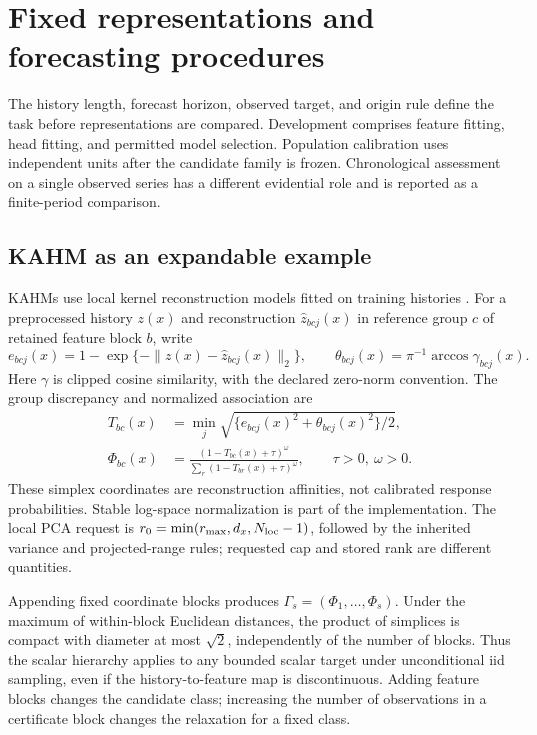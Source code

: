 \section{Fixed representations and forecasting procedures}
\label{sec:representations}
The history length, forecast horizon, observed target, and origin rule define the task before representations are compared. Development comprises feature fitting, head fitting, and permitted model selection. Population calibration uses independent units after the candidate family is frozen. Chronological assessment on a single observed series has a different evidential role and is reported as a finite-period comparison.

\subsection{KAHM as an expandable example}
KAHMs use local kernel reconstruction models fitted on training histories \citep{kumar2024kahm,kumar2025collaborative,kumar2026limits}. For a preprocessed history $z(x)$ and reconstruction $\widehat z_{bcj}(x)$ in reference group $c$ of retained feature block $b$, write
\[
e_{bcj}(x)=1-\exp\{-\|z(x)-\widehat z_{bcj}(x)\|_2\},
\qquad
\theta_{bcj}(x)=\pi^{-1}\arccos\gamma_{bcj}(x).
\]
Here $\gamma$ is clipped cosine similarity, with the declared zero-norm convention. The group discrepancy and normalized association are
\begin{align*}
T_{bc}(x)&=\min_j\sqrt{\{e_{bcj}(x)^2+\theta_{bcj}(x)^2\}/2},\\
\Phi_{bc}(x)&=
\frac{(1-T_{bc}(x)+\tau)^\omega}
{\sum_r(1-T_{br}(x)+\tau)^\omega},
\qquad \tau>0,\ \omega>0.
\end{align*}
These simplex coordinates are reconstruction affinities, not calibrated response probabilities. Stable log-space normalization is part of the implementation. The local PCA request is
$r_0=\min(r_{\max},d_x,N_{\rm loc}-1)$, followed by the inherited variance and projected-range rules; requested cap and stored rank are different quantities.

Appending fixed coordinate blocks produces $\Gamma_s=(\Phi_1,\ldots,\Phi_s)$. Under the maximum of within-block Euclidean distances, the product of simplices is compact with diameter at most $\sqrt2$, independently of the number of blocks. Thus the scalar hierarchy applies to any bounded scalar target under unconditional iid sampling, even if the history-to-feature map is discontinuous. Adding feature blocks changes the candidate class; increasing the number of observations in a certificate block changes the relaxation for a fixed class.

